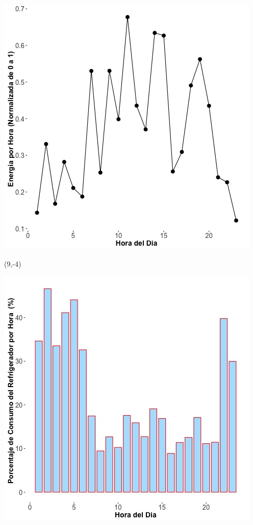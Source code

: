 \documentclass{article}\usepackage[]{graphicx}\usepackage[]{color}
\newenvironment{knitrout}{}{} %
\begin{document}
\begin{knitrout}
\color{fgcolor}
\includegraphics[scale=0.75]{figure/A26_fplot_norm_median} 
\end{knitrout}


 \begin{textblock}{1}(9,-4)
\begin{minipage}{20em}
\begingroup

\endgroup
\end{minipage}
\end{textblock}

 \vspace{2cm}

\begin{knitrout}
\color{fgcolor}
\includegraphics[scale=0.65]{figure/A26_fridge_energy_pct.jpg} 
\end{knitrout}
\end{document}
